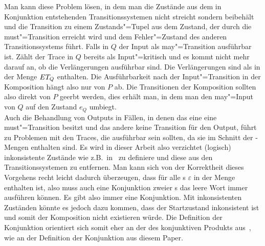 Man kann diese Problem lösen, in dem man die Zustände aus dem in Konjunktion
entstehenden Transitionssystemen nicht streicht sondern beibehält und die
Transition zu einem Zustands"=Tupel aus dem Zustand, der durch die
must"=Transition erreicht wird und dem Fehler"=Zustand des anderen
Transitionssystems führt. Falls in $Q$ der Input als may"=Transition ausführbar
ist. Zählt der Trace in $Q$ bereits als Input"=kritisch und es kommt nicht mehr
darauf an, ob die Verlängerungen ausführbar sind. Die Verlängerungen sind als
in der Menge $ET _Q$ enthalten. Die Ausführbarkeit nach der Input"=Transition
in der Komposition hängt also nur von $P$ ab. Die Transitionen der Komposition
sollten also direkt von $P$ geerbt werden, dies erhält man, in dem man den
may"=Input von $Q$ auf den Zustand $e_Q$ umbiegt.\\
Auch die Behandlung von Outputs in Fällen, in denen das eine \MEIO{} eine
must"=Transition besitzt und das andere keine Transition für den Output, führt
zu Problemen mit den Traces, die ausführbar sein sollten, da sie im Schnitt der
\EL{}-Mengen enthalten sind. Es wird in dieser Arbeit also verzichtet (logisch)
inkonsistente Zustände wie z.B.\ in~\cite{Vogler2016MIA3} zu definiere und
diese aus den Transitionssystemen zu entfernen. Man kann sich von der
Korrektheit dieses Vorgehens recht leicht dadurch überzeugen, dass für alle
\MEIO{}s $\varepsilon$ in der Menge \EL{} enthalten ist, also muss auch eine
Konjunktion zweier \MEIO{}s das leere Wort immer ausführen können. Es gibt also
immer eine Konjunktion. Mit inkonsistenten Zuständen könnte es jedoch dazu
kommen, dass der Startzustand inkonsistent ist und somit der Komposition nicht
existieren würde. Die Definition der Konjunktion orientiert sich somit eher an
der des konjunktiven Produkts aus~\cite{Vogler2016MIA3}, wie an der Definition
der Konjunktion aus diesem Paper.

